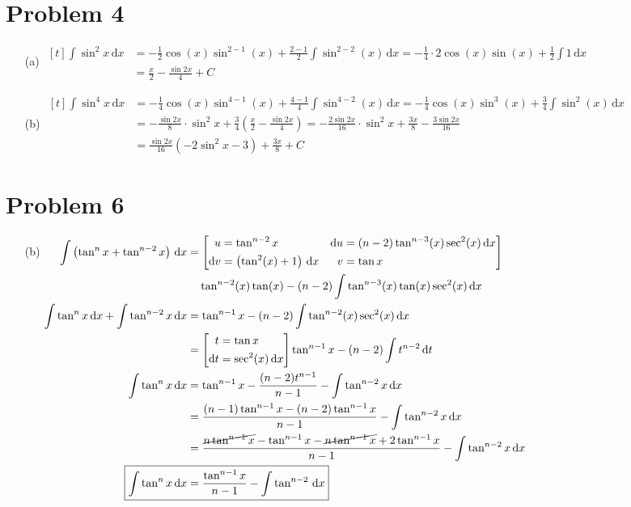 \documentclass[preview, margin=0.6in]{standalone}
\newcommand*{\problem}[1]{\section*{Problem #1}}
\begin{document}
\problem{4}
\begin{itemize}
	\item[(a)]
		$\begin{aligned}[t]
		    \int \sin^2x\,\mathrm{d}x
			&=-\frac12 \cos (x) \sin^{2-1}(x)+\frac{2-1}{2}\int \sin^{2-2}(x)\,\mathrm{d}x
			=-\frac14\cdot2\cos(x)\sin(x)+\frac12 \int 1\,\mathrm{d}x \\
			&=\frac x2-\frac{\sin2x}{4}+C
		\end{aligned}$

	\item[(b)]
		$\begin{aligned}[t]
		    \int \sin^4x\,\mathrm{d}x
			&=-\frac14 \cos (x) \sin^{4-1}(x)+\frac{4-1}{4}\int \sin^{4-2}(x)\,\mathrm{d}x
			=-\frac14\cos(x)\sin^3(x)+\frac34 \int \sin^2(x)\,\mathrm{d}x \\
			&=-\frac{\sin2x}{8}\cdot\sin^2x+\frac34\left(\frac x2-\frac{\sin 2x}{4}\right)
			=-\frac{2\sin2x}{16}\cdot\sin^2x+\frac{3x}{8}-\frac{3\sin 2x}{16} \\
			&=\boxed{\frac{\sin2x}{16}\left(-2\sin^2x-3\right)+\frac{3x}{8}+C}
		\end{aligned}$
\end{itemize}

\problem{6}
\begin{itemize}
	\item[(b)]
		$\begin{aligned}[t]
			\int \left(\tan^n x+\tan^{n-2}x\right)\,\mathrm{d}x
			&=\left[\begin{alignedat}{2}
					u&=\tan^{n-2}x &\quad \mathrm{d}u&=(n-2)\tan^{n-3}(x)\sec^2(x)\,\mathrm{d}x \\
					\mathrm{d}v&=\left(\tan^2(x)+1\right)\,\mathrm{d}x & v&=\tan x
			\end{alignedat}\right] \\
			&\phantom{={}}\tan^{n-2}(x)\tan(x)-(n-2)\int \tan^{n-3}(x)\tan(x)\sec^2(x)\,\mathrm{d}x \\
			\int \tan^nx\,\mathrm{d}x+\int \tan^{n-2}x\,\mathrm{d}x&=\tan^{n-1}x-(n-2)\int \tan^{n-2}(x)\sec^2(x)\,\mathrm{d}x \\
			&=\left[\begin{aligned}
				t&=\tan x \\
				\mathrm{d}t&=\sec^2(x)\,\mathrm{d}x
			\end{aligned}\right]
			\tan^{n-1}x-(n-2)\int t^{n-2}\,\mathrm{d}t \\
			\int \tan^nx\,\mathrm{d}x&=\tan^{n-1}x-\frac{(n-2)t^{n-1}}{n-1}-\int \tan^{n-2}x\,\mathrm{d}x \\
			&=\frac{(n-1)\tan^{n-1}x-(n-2)\tan^{n-1}x}{n-1}-\int \tan^{n-2}x\,\mathrm{d}x \\
			&=\frac{\cancel{n\tan^{n-1}x}-\tan^{n-1}x-\cancel{n\tan^{n-1}x}+2\tan^{n-1}x}{n-1}-\int \tan^{n-2}x\,\mathrm{d}x \\
			\Aboxed{\int \tan^nx\,\mathrm{d}x&=\frac{\tan^{n-1}x}{n-1}-\int \tan^{n-2}\,\mathrm{d}x}
		\end{aligned}$
\end{itemize}
\end{document}
